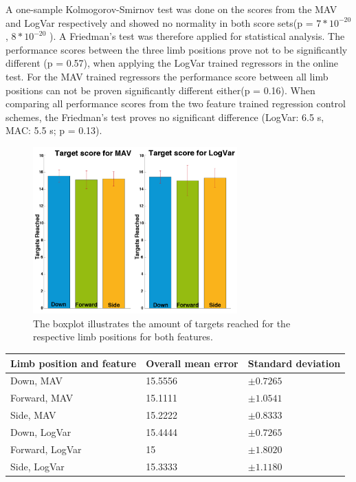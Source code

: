 A one-sample Kolmogorov-Smirnov test was done on the scores from the MAV and LogVar respectively and showed no normality in both score sets(p = $7 * 10^{-20}$, $8 * 10^{-20}$ ). A Friedman's test was therefore applied for statistical analysis. The performance scores between the three limb positions prove not to be significantly different (p = 0.57), when applying the LogVar trained regressors in the online test. For the MAV trained regressors the performance score between all limb positions can not be proven significantly different either(p = 0.16). When comparing all performance scores from the two feature trained regression control schemes, the Friedman's test proves no significant difference (LogVar: 6.5 s, MAC: 5.5 s; p = 0.13).

\begin{figure}[H]
	\includegraphics[width=0.7\textwidth]{figures/results/TargetsReached}  %
	\caption{The boxplot illustrates the amount of targets reached for the respective limb positions for both features.}
	\label{fig:TargetsReached}  %
\end{figure}

	\begin{center}
		\begin{tabular}{l l l}
			\toprule
			\textbf{Limb position and feature} & \textbf{Overall mean error} & \textbf{Standard deviation}\\
			\midrule
			Down, MAV & 15.5556 & $\pm 0.7265$ \\
			Forward, MAV & 15.1111 & $\pm 1.0541$ \\
			Side, MAV & 15.2222 & $\pm 0.8333$ \\
			Down, LogVar & 15.4444 & $\pm 0.7265$ \\
			Forward, LogVar & 15 & $\pm 1.8020$ \\
			Side, LogVar & 15.3333 & $\pm 1.1180$ \\
			\bottomrule
		\end{tabular}
	\end{center}

